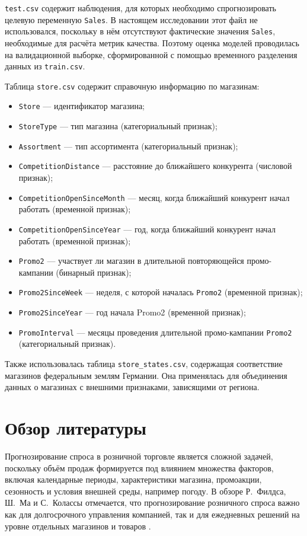\documentclass[12pt,a4paper]{article}
\numberwithin{equation}{section}
\begin{document}
\texttt{test.csv} содержит наблюдения, для которых необходимо спрогнозировать целевую переменную \texttt{Sales}. В настоящем исследовании этот файл не использовался, поскольку в нём отсутствуют фактические значения \texttt{Sales}, необходимые для расчёта метрик качества. Поэтому оценка моделей проводилась на валидационной выборке, сформированной с помощью временного разделения данных из \texttt{train.csv}.

Таблица \texttt{store.csv} содержит справочную информацию по магазинам:
\begin{itemize}
    \item \texttt{Store} — идентификатор магазина;
    \item \texttt{StoreType} — тип магазина (категориальный признак);
    \item \texttt{Assortment} — тип ассортимента (категориальный признак);
    \item \texttt{CompetitionDistance} — расстояние до ближайшего конкурента (числовой признак);
    \item \texttt{CompetitionOpenSinceMonth} — месяц, когда ближайший конкурент начал работать (временной признак);
    \item \texttt{CompetitionOpenSinceYear} — год, когда ближайший конкурент начал работать (временной признак);
    \item \texttt{Promo2} — участвует ли магазин в длительной повторяющейся промо-кампании (бинарный признак);
    \item \texttt{Promo2SinceWeek} — неделя, с которой началась \texttt{Promo2} (временной признак);
    \item \texttt{Promo2SinceYear} — год начала Promo2 (временной признак);
    \item \texttt{PromoInterval} — месяцы проведения длительной промо-кампании \texttt{Promo2} (категориальный признак).
\end{itemize}

Также использовалась таблица \texttt{store\_states.csv}, содержащая соответствие магазинов федеральным землям Германии. Она применялась для объединения данных о магазинах с внешними признаками, зависящими от региона.

\section{Обзор литературы}

Прогнозирование спроса в розничной торговле является сложной задачей, поскольку объём продаж формируется под влиянием множества факторов, включая календарные периоды, характеристики магазина, промоакции, сезонность и условия внешней среды, например погоду. В обзоре Р.~Филдса, Ш.~Ма и С.~Колассы отмечается, что прогнозирование розничного спроса важно как для долгосрочного управления компанией, так и для ежедневных решений на уровне отдельных магазинов и товаров \cite{fildes2022retail}.
\end{document}
